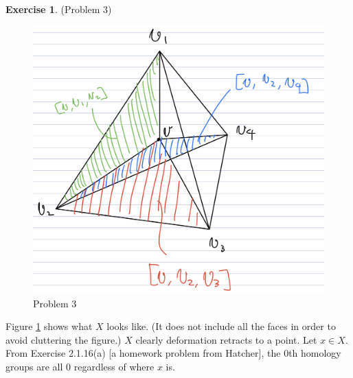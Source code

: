 \documentclass[12pt, psamsfonts]{amsart}
\theoremstyle{definition}
\newtheorem*{exer}{Exercise}
\theoremstyle{remark}
\numberwithin{equation}{section}
\begin{document}
\begin{exer}{(Problem 3)}
  \begin{figure}[!htb]
    \includegraphics[width=.5\linewidth]{problem3.jpeg}
    \caption{Problem 3}
    \label{fig:problem3}
  \end{figure}
  Figure \ref{fig:problem3} shows what $X$ looks like.
  (It does not include all the faces in order to avoid cluttering the figure.)
  $X$ clearly deformation retracts to a point.
  Let $x \in X$.
  From Exercise 2.1.16(a) [a homework problem from Hatcher], the 0th homology groups are all 0 regardless of where $x$ is.


\end{exer}
\end{document}

